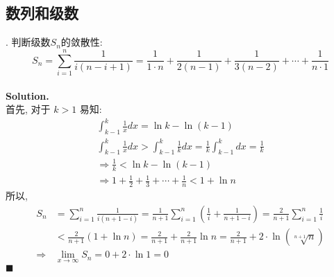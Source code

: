 \documentclass[UTF8]{article}
\begin{document}
\subsection{数列和级数}

. 判断级数$S_n$的敛散性: $$S_n = \sum_{i=1}^{n}\frac{1}{i(n-i+1)} = \frac{1}{1\cdot n} + \frac{1}{2(n-1)} + \frac{1}{3(n-2)}+ \cdots + \frac{1}{n \cdot 1}$$ \\
\noindent \textbf{Solution.} \\
首先, 对于 $k>1$ 易知: 
\begin{align*}
\int_{k-1}^{k}\frac{1}{x}dx = \ln k - \ln(k-1) \\
\int_{k-1}^{k}\frac{1}{x}dx > \int_{k-1}^{k}\frac{1}{k}dx = \frac{1}{k}\int_{k-1}^{k}dx = \frac{1}{k} \\
\Longrightarrow \frac{1}{k} < \ln k - \ln (k-1) \\
\Longrightarrow 1+\frac{1}{2} + \frac{1}{3} + \cdots + \frac{1}{n} < 1+ \ln n
\end{align*}
所以, 
\begin{align*}
S_n & = \sum_{i=1}^{n}\frac{1}{i(n+1-i)} = \frac{1}{n+1}\sum_{i=1}^{n}\left(\frac{1}{i}+\frac{1}{n+1-i}\right) = \frac{2}{n+1} \sum_{i=1}^{n}  \frac{1}{i} \\
& < \frac{2}{n+1}(1+\ln n) = \frac{2}{n+1} + \frac{2}{n+1} \ln n = \frac{2}{n+1} + 2 \cdot \ln \left(\sqrt[n+1]{n}\right) \\
\Longrightarrow & \lim_{x \to \infty}S_n = 0 + 2\cdot \ln 1 = 0 
\end{align*}
$\blacksquare$
\end{document}
